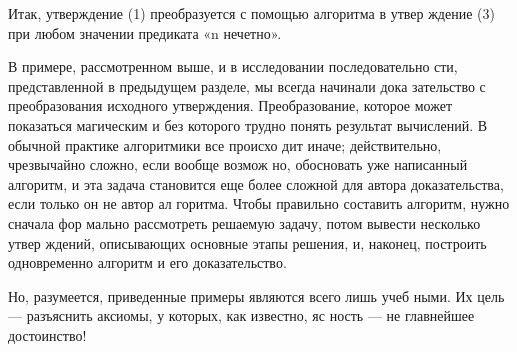 \parindent=1cm Итак, утверждение (1) преобразуется с помощью алгоритма в утвер­
ждение  (3)  при любом значении  предиката «n  нечетно».

\parindent=1cm В примере, рассмотренном выше, и в исследовании последовательно­
сти,  представленной в предыдущем  разделе,  мы  всегда начинали  дока­
зательство с преобразования исходного утверждения. Преобразование, 
которое может показаться  магическим  и  без  которого трудно  понять 
результат вычислений. В обычной практике алгоритмики все происхо­
дит  иначе;  действительно,  чрезвычайно  сложно,  если  вообще  возмож­
но, обосновать уже написанный алгоритм, и эта задача становится еще 
более сложной для  автора доказательства, если только он не автор ал­
горитма.  Чтобы  правильно составить  алгоритм,  нужно  сначала фор­
мально рассмотреть решаемую задачу, потом вывести несколько утвер­
ждений, описывающих основные этапы решения, и, наконец, построить 
одновременно алгоритм и его доказательство.
\pagebreak

Но,  разумеется,  приведенные  примеры  являются  всего  лишь  учеб­
ными.  Их  цель  —  разъяснить  аксиомы,  у  которых,  как  известно,  яс­
ность — не  главнейшее  достоинство!
